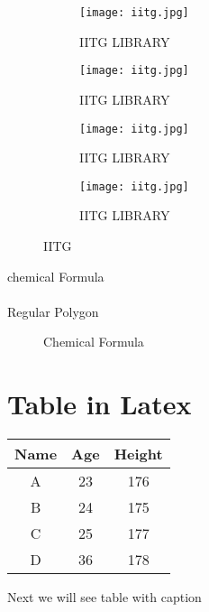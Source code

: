 \documentclass[a4paper, 12pt]{article}
\begin{document}
	\begin{figure}[h]
		\begin{subfigure}{0.5\textwidth}
			\centering
			\texttt{[image: iitg.jpg]}
			\caption{IITG LIBRARY}
		\end{subfigure}
		\begin{subfigure}{0.5\textwidth}
			\centering
			\texttt{[image: iitg.jpg]}
			\caption{IITG LIBRARY}
		\end{subfigure}
		\begin{subfigure}{0.5\textwidth}
			\centering
			\texttt{[image: iitg.jpg]}
			\caption{IITG LIBRARY}
		\end{subfigure}
		\begin{subfigure}{0.5\textwidth}
			\centering
			\texttt{[image: iitg.jpg]}
			\caption{IITG LIBRARY}
		\end{subfigure}
		\caption{IITG}
	\end{figure}            
	
	\newpage
	chemical Formula \\
	\newline
	\\
	Regular Polygon
	
	
	\begin{figure}[h]
		\centering
		\caption{Chemical Formula}
	\end{figure}    
	
	
	\newpage
	
	\section{Table in Latex}
	
	\begin{tabular}{|c|c|c|}
		\hline
		Name & Age & Height\\ \hline
		A  & 23 & 176 \\ \hline
		B  & 24 & 175 \\ \hline
		C  & 25 & 177\\ \hline
		D  & 36 & 178 \\ \hline
	\end{tabular}
	
	\vspace{3mm}
	Next we will see table with caption
	
\end{document}
